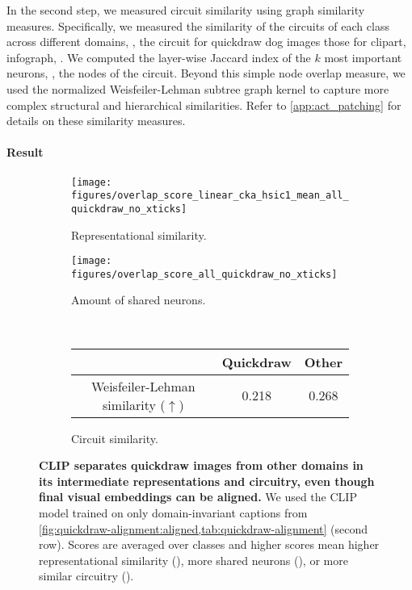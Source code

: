 In the second step, we measured circuit similarity using graph similarity measures. Specifically, we measured the similarity of the circuits of each class across different domains, \eg, the circuit for quickdraw dog images \vs those for clipart, infograph, \etc. We computed the layer-wise Jaccard index of the $k$ most important neurons, \ie, the nodes of the circuit. Beyond this simple node overlap measure, we used the normalized Weisfeiler-Lehman subtree graph kernel \citep{shervashidze2011weisfeiler} to capture more complex structural and hierarchical similarities. Refer to \cref{app:act_patching} for details on these similarity measures.

\paragraph{Result}
\begin{figure}[t]
    \centering
    \begin{subfigure}[t]{0.49\linewidth}
        \centering
        \texttt{[image: figures/overlap\_score\_linear\_cka\_hsic1\_mean\_all\_quickdraw\_no\_xticks]}
        \caption{Representational similarity.}
        \label{subfig:repr-similarity}
    \end{subfigure}
    \begin{subfigure}[t]{0.49\linewidth}
        \centering
        \texttt{[image: figures/overlap\_score\_all\_quickdraw\_no\_xticks]}
        \caption{Amount of shared neurons.}
        \label{subfig:shared-neurons}
    \end{subfigure}\\\bigskip
    \begin{subfigure}[t]{\linewidth}
        \centering
        \begin{tabular}{ccc}
            \toprule
             & Quickdraw & Other \\\midrule
            Weisfeiler-Lehman similarity ($\uparrow$) & 0.218 & 0.268 \\
             \bottomrule
        \end{tabular}
        \caption{Circuit similarity.}
        \label{subfig:graph-sim}
    \end{subfigure}
    \caption{\textbf{CLIP separates quickdraw images from other domains in its intermediate representations and circuitry, even though final visual embeddings can be aligned.} We used the CLIP model trained on only domain-invariant captions from \cref{fig:quickdraw-alignment:aligned,tab:quickdraw-alignment} (second row).
    Scores are averaged over classes and higher scores mean higher representational similarity (), more shared neurons (), or more similar circuitry ().}
    \label{fig:quickdraw-analysis}
\end{figure}
